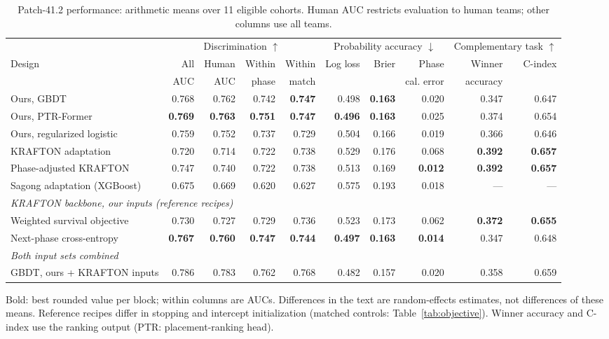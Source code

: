 \begin{table}[t]
\centering\footnotesize
\caption{Patch-41.2 performance: arithmetic means over 11 eligible cohorts. Human AUC restricts evaluation to human teams; other columns use all teams.}
\label{tab:main}
\setlength{\tabcolsep}{2.5pt}
\begin{tabular*}{\textwidth}{@{\extracolsep{\fill}}lrrrrrrrrr@{}}
\toprule
 & \multicolumn{4}{c}{Discrimination $\uparrow$} & \multicolumn{3}{c}{Probability accuracy $\downarrow$} & \multicolumn{2}{c}{Complementary task $\uparrow$} \\
\cmidrule(lr){2-5}\cmidrule(lr){6-8}\cmidrule(lr){9-10}
Design & All & Human & Within & Within & Log loss & Brier & Phase & Winner & C-index \\
 & AUC & AUC & phase & match & & & cal. error & accuracy & \\
\midrule
Ours, GBDT & 0.768 & 0.762 & 0.742 & \textbf{0.747} & 0.498 & \textbf{0.163} & 0.020 & 0.347 & 0.647 \\
Ours, PTR-Former & \textbf{0.769} & \textbf{0.763} & \textbf{0.751} & \textbf{0.747} & \textbf{0.496} & \textbf{0.163} & 0.025 & 0.374 & 0.654 \\
Ours, regularized logistic & 0.759 & 0.752 & 0.737 & 0.729 & 0.504 & 0.166 & 0.019 & 0.366 & 0.646 \\
KRAFTON adaptation & 0.720 & 0.714 & 0.722 & 0.738 & 0.529 & 0.176 & 0.068 & \textbf{0.392} & \textbf{0.657} \\
Phase-adjusted KRAFTON & 0.747 & 0.740 & 0.722 & 0.738 & 0.513 & 0.169 & \textbf{0.012} & \textbf{0.392} & \textbf{0.657} \\
Sagong adaptation (XGBoost) & 0.675 & 0.669 & 0.620 & 0.627 & 0.575 & 0.193 & 0.018 & --- & --- \\
\midrule
\multicolumn{10}{l}{\emph{KRAFTON backbone, our inputs (reference recipes)}} \\
Weighted survival objective & 0.730 & 0.727 & 0.729 & 0.736 & 0.523 & 0.173 & 0.062 & \textbf{0.372} & \textbf{0.655} \\
Next-phase cross-entropy & \textbf{0.767} & \textbf{0.760} & \textbf{0.747} & \textbf{0.744} & \textbf{0.497} & \textbf{0.163} & \textbf{0.014} & 0.347 & 0.648 \\
\midrule
\multicolumn{10}{l}{\emph{Both input sets combined}} \\
GBDT, ours + KRAFTON inputs & 0.786 & 0.783 & 0.762 & 0.768 & 0.482 & 0.157 & 0.020 & 0.358 & 0.659 \\
\bottomrule
\end{tabular*}
\smallskip
\parbox{\textwidth}{\scriptsize Bold: best rounded value per block; within columns are AUCs. Differences in the text are random-effects estimates, not differences of these means. Reference recipes differ in stopping and intercept initialization (matched controls: Table~\ref{tab:objective}). Winner accuracy and C-index use the ranking output (PTR: placement-ranking head).}
\end{table}
